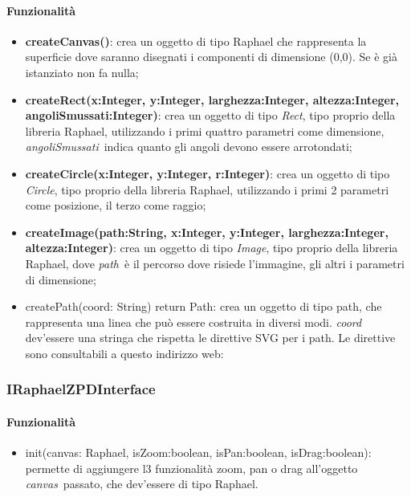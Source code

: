 \paragraph{Funzionalità}
\begin{itemize}
\item \textbf{createCanvas()}: crea un oggetto di tipo Raphael che rappresenta la superficie dove saranno disegnati i componenti di dimensione (0,0). Se è già istanziato non fa nulla;
\item \textbf{createRect(x:Integer, y:Integer, larghezza:Integer, altezza:Integer, angoliSmussati:Integer)}: crea un oggetto di tipo \textit{Rect}, tipo proprio della libreria Raphael, utilizzando i primi quattro parametri come dimensione, \textit{angoliSmussati}\ indica quanto gli angoli devono essere arrotondati;
\item \textbf{createCircle(x:Integer, y:Integer, r:Integer)}: crea un oggetto di tipo \textit{Circle}, tipo proprio della libreria Raphael, utilizzando i primi 2 parametri come posizione, il terzo come raggio;
\item \textbf{createImage(path:String, x:Integer, y:Integer, larghezza:Integer, altezza:Integer)}: crea un oggetto di tipo \textit{Image}, tipo proprio della libreria Raphael, dove \textit{path}\ è il percorso dove risiede l'immagine, gli altri i parametri di dimensione;
\item createPath(coord: String) return Path: crea un oggetto di tipo path, che rappresenta una linea che può essere costruita in diversi modi. \textit{coord} dev'essere una stringa che rispetta le direttive SVG per i path. Le direttive sono consultabili a questo indirizzo web: \\
\end{itemize}
\subsubsection{IRaphaelZPDInterface}
\paragraph{Funzionalità}
\begin{itemize}
\item init(canvas: Raphael, isZoom:boolean, isPan:boolean, isDrag:boolean): permette di aggiungere l3 funzionalità zoom, pan o drag all'oggetto \textit{canvas}\ passato, che dev'essere di tipo Raphael.
\end{itemize}

